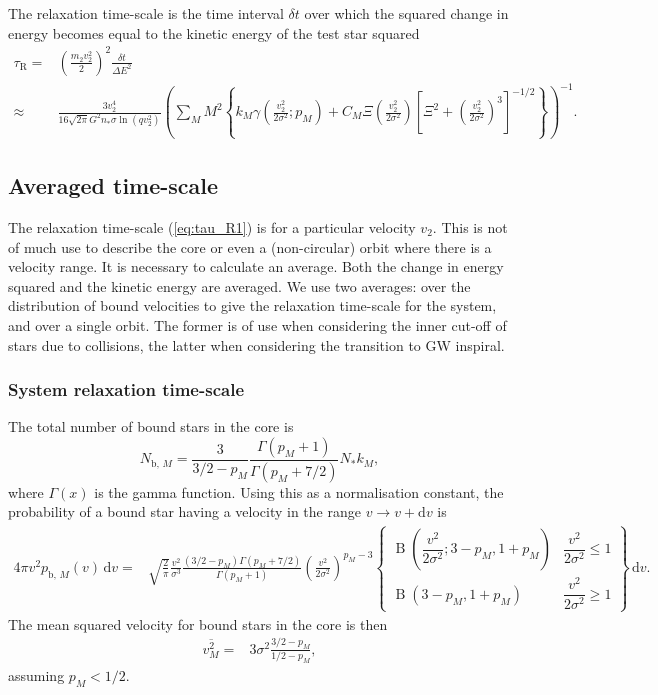 \documentclass[useAMS,usedcolumn,usegraphicx,usenatbib]{mn2e}
\newcommand{\eqnref}[1]{(\ref{eq:#1})}
\DeclareMathOperator{\Beta}{B}
\newcommand{\sub}[1]{\ensuremath{_\mathrm{#1}}}
\newcommand{\dd}{\ensuremath{\mathrm{d}}}
\begin{document}
\begin{onecolumn}
The relaxation time-scale is the time interval $\delta t$ over which the squared change in energy becomes equal to the kinetic energy of the test star squared \citep{Bar-Or2012}
\begin{align}
\tau\sub{R} = {} & \left(\frac{m_2v_2^2}{2}\right)^2\frac{\delta t}{\Delta E^2} \\
 \approx {} & \frac{3v_2^4}{16\sqrt{2\pi}G^2n_\ast\sigma\ln\left(qv_2^2\right)} \left(\sum_M M^2 \left\{k_M \gamma\left(\frac{v_2^2}{2\sigma^2};p_M\right) + C_M\Xi\left(\frac{v_2^2}{2\sigma^2}\right)\left[\Xi^2 + \left(\frac{v_2^2}{2\sigma^2}\right)^3\right]^{-1/2}\right\}\right)^{-1}.
\label{eq:tau_R1}
\end{align}

\subsection{Averaged time-scale}

The relaxation time-scale \eqnref{tau_R1} is for a particular velocity $v_2$. This is not of much use to describe the core or even a (non-circular) orbit where there is a velocity range. It is necessary to calculate an average. Both the change in energy squared and the kinetic energy are averaged. We use two averages: over the distribution of bound velocities to give the relaxation time-scale for the system, and over a single orbit. The former is of use when considering the inner cut-off of stars due to collisions, the latter when considering the transition to GW inspiral.

\subsubsection{System relaxation time-scale}\label{sec:system-ave}

The total number of bound stars in the core is
\begin{equation}
N_{\mathrm{b},\,M} = \frac{3}{3/2 - p_M}\frac{\Gamma(p_M + 1)}{\Gamma(p_M + 7/2)}N_\ast k_M,
\end{equation}
where $\Gamma(x)$ is the gamma function. Using this as a normalisation constant, the probability of a bound star having a velocity in the range $v \rightarrow v + \dd v$ is
\begin{align}
4\pi v^2 p_{\mathrm{b},\,M}(v) \,\dd v = {} & \sqrt{\frac{2}{\pi}} \frac{v^2}{\sigma^3} \frac{\left(3/2 - p_M\right)\Gamma(p_M + 7/2)}{\Gamma(p_M + 1)} \left(\frac{v^2}{2\sigma^2}\right)^{p_M - 3}\left\{\begin{array}{lr}
\Beta\left(\dfrac{v^2}{2\sigma^2}; 3 - p_M, 1 + p_M\right) & \dfrac{v^2}{2\sigma^2} \leq 1 \\
\Beta\left(3 - p_M, 1 + p_M\right) & \dfrac{v^2}{2\sigma^2} \geq 1\end{array}\right\}\,\dd v.
\end{align}
The mean squared velocity for bound stars in the core is then
\begin{align}
\overline{v^2_{M}} = {} & 3\sigma^2\frac{3/2 - p_M}{1/2 - p_M},
\end{align}
assuming $p_M < 1/2$.


\end{onecolumn}
\end{document}
